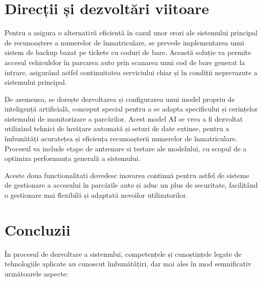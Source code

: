 \documentclass[a4paper,12pt]{report}
\begin{document}
\section{Direcții și dezvoltări viitoare}
Pentru a asigura o alternativă eficientă în cazul unor erori ale sistemului principal de recunoaștere a numerelor de înmatriculare, se prevede implementarea unui sistem de backup bazat pe tickete cu coduri de bare. Această soluție va permite accesul vehiculelor în parcarea auto prin scanarea unui cod de bare generat la intrare, asigurând astfel continuitatea serviciului chiar și în condiții neprevazute a sistemului principal.

De asemenea, se dorește dezvoltarea și configurarea unui model propriu de inteligență artificială, conceput special pentru a se adapta specificului și cerințelor sistemului de monitorizare a parcărilor. Acest model AI se vrea a fi dezvoltat utilizând tehnici de învățare automată și seturi de date extinse, pentru a îmbunătăți acuratețea și eficiența recunoașterii numerelor de înmatriculare. Procesul va include etape de antrenare si testare ale modelului, cu scopul de a optimiza performanța generală a sistemului.

Aceste doua functionalitati dovedesc inovarea continuă pentru astfel de sisteme de gestionare a accesului în parcările auto și aduc un plus de securitate, facilitând o gestionare mai flexibilă și adaptată nevoilor utilizatorilor.

\section{Concluzii}
În procesul de dezvoltare a sistemului, competențele și cunoștințele legate de tehnologiile aplicate au cunoscut îmbunătățiri, dar mai ales în mod semnificativ următoarele aspecte:
\end{document}
